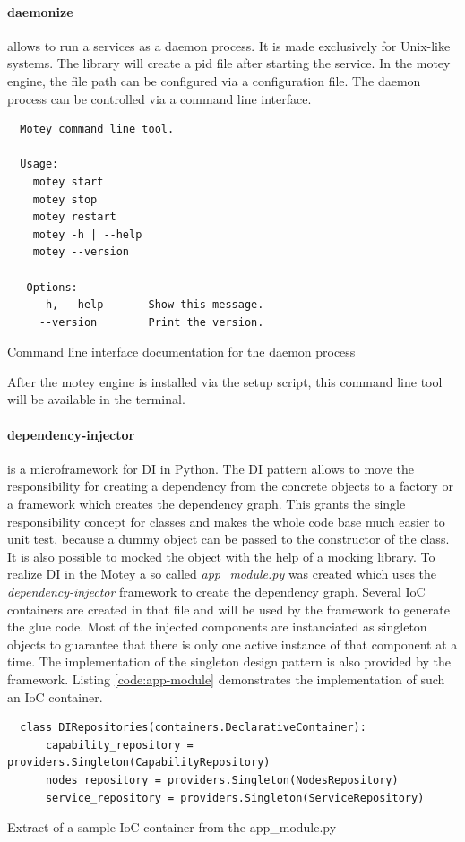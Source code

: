 \paragraph{daemonize} allows to run a services as a daemon process.
It is made exclusively for Unix-like systems.
The library will create a pid file after starting the service.
In the motey engine, the file path can be configured via a configuration file.
The daemon process can be controlled via a command line interface.
\begin{listing}[H]
  \begin{verbatim}
  Motey command line tool.

  Usage:
    motey start
    motey stop
    motey restart
    motey -h | --help
    motey --version

   Options:
     -h, --help       Show this message.
     --version        Print the version.
  \end{verbatim}
  \caption{Command line interface documentation for the daemon process}
  \label{code:cli-tool}
\end{listing}
After the motey engine is installed via the setup script, this command line tool will be available in the terminal.

\paragraph{dependency-injector} is a microframework for \acf{DI} in Python.
The \ac{DI} pattern allows to move the responsibility for creating a dependency from the concrete objects to a factory or a framework which creates the dependency graph.
This grants the single responsibility concept for classes and makes the whole code base much easier to unit test, because a dummy object can be passed to the constructor of the class.
It is also possible to mocked the object with the help of a mocking library.
To realize \ac{DI} in the Motey a so called \textit{app\_module.py} was created which uses the \textit{dependency-injector} framework to create the dependency graph.
Several \ac{IoC} containers are created in that file and will be used by the framework to generate the glue code.
Most of the injected components are instanciated as singleton objects to guarantee that there is only one active instance of that component at a time.
The implementation of the singleton design pattern is also provided by the framework.
Listing \ref{code:app-module} demonstrates the implementation of such an \ac{IoC} container.
\begin{listing}[H]
  \begin{verbatim}
  class DIRepositories(containers.DeclarativeContainer):
      capability_repository = providers.Singleton(CapabilityRepository)
      nodes_repository = providers.Singleton(NodesRepository)
      service_repository = providers.Singleton(ServiceRepository)
  \end{verbatim}
  \caption{Extract of a sample \ac{IoC} container from the app\_module.py}
  \label{code:app-module}
\end{listing}

